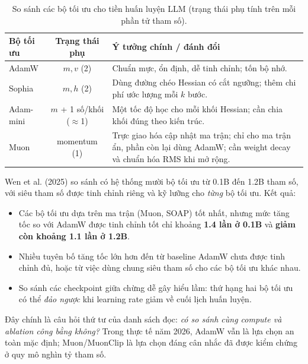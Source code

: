 \begin{table}[H]
\centering
\caption{So sánh các bộ tối ưu cho tiền huấn luyện LLM (trạng thái phụ tính trên mỗi phần tử tham số).}
\label{tab:optimizer_comparison}
\begin{tabularx}{\textwidth}{@{}lcX@{}}
\toprule
\textbf{Bộ tối ưu} & \textbf{Trạng thái phụ} & \textbf{Ý tưởng chính / đánh đổi} \\
\midrule
AdamW & $m, v$ (2) & Chuẩn mực, ổn định, dễ tinh chỉnh; tốn bộ nhớ. \\
Sophia & $m, h$ (2) & Dùng đường chéo Hessian có cắt ngưỡng; thêm chi phí ước lượng mỗi $k$ bước. \\
Adam-mini & $m$ + 1 số/khối ($\approx$1) & Một tốc độ học cho mỗi khối Hessian; cần chia khối đúng theo kiến trúc. \\
Muon & momentum (1) & Trực giao hóa cập nhật ma trận; chỉ cho ma trận ẩn, phần còn lại dùng AdamW; cần weight decay và chuẩn hóa RMS khi mở rộng. \\
\bottomrule
\end{tabularx}
\end{table}

\begin{tcolorbox}[title={Cẩn trọng khi đọc các tuyên bố “nhanh hơn AdamW 2 lần”}, colback=red!5!white, colframe=red!75!black, fonttitle=\bfseries]
Wen et al. (2025) \cite{wen2025fantastic} so sánh có hệ thống mười bộ tối ưu từ 0.1B đến 1.2B tham số, với siêu tham số được tinh chỉnh riêng và kỹ lưỡng cho \emph{từng} bộ tối ưu. Kết quả:
\begin{itemize}
	\item Các bộ tối ưu dựa trên ma trận (Muon, SOAP) tốt nhất, nhưng mức tăng tốc so với AdamW được tinh chỉnh tốt chỉ khoảng \textbf{1.4 lần ở 0.1B} và \textbf{giảm còn khoảng 1.1 lần ở 1.2B}.
	\item Nhiều tuyên bố tăng tốc lớn hơn đến từ baseline AdamW chưa được tinh chỉnh đủ, hoặc từ việc dùng chung siêu tham số cho các bộ tối ưu khác nhau.
	\item So sánh các checkpoint giữa chừng dễ gây hiểu lầm: thứ hạng hai bộ tối ưu có thể \emph{đảo ngược} khi learning rate giảm về cuối lịch huấn luyện.
\end{itemize}
Đây chính là câu hỏi thứ tư của danh sách đọc: \emph{có so sánh cùng compute và ablation công bằng không?} Trong thực tế năm 2026, AdamW vẫn là lựa chọn an toàn mặc định; Muon/MuonClip là lựa chọn đáng cân nhắc đã được kiểm chứng ở quy mô nghìn tỷ tham số.
\end{tcolorbox}
